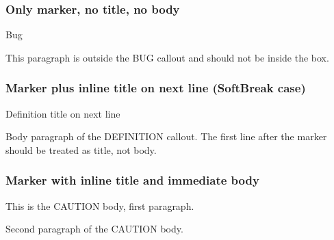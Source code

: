 \subsubsection{Only marker, no title, no
body}\label{only-marker-no-title-no-body}

\vspace{2mm}

\noindent\begin{tcolorbox}[colback=ocRed2Back,colframe=ocRed2Frame,coltitle=ocRed2Title,left=3mm,width=\linewidth,boxrule=0pt]

\hspace*{-2.5mm}\iconBug\; Bug

\end{tcolorbox}

This paragraph is outside the BUG callout and should not be inside the
box.

\subsubsection{Marker plus inline title on next line (SoftBreak
case)}\label{marker-plus-inline-title-on-next-line-softbreak-case}

\begin{tcolorbox}[breakable,colback=ocPinBack,colframe=ocPinFrame,coltitle=ocPinTitle,left=3mm,boxed title style={left=1mm},title={\hspace*{-2.5mm}\iconDefinition\; Definition}]

Definition title on next line

Body paragraph of the DEFINITION callout. The first line after the
marker should be treated as title, not body.

\end{tcolorbox}

\subsubsection{Marker with inline title and immediate
body}\label{marker-with-inline-title-and-immediate-body}

\begin{tcolorbox}[breakable,colback=ocOrgBack,colframe=ocOrgFrame,coltitle=ocOrgTitle,left=3mm,boxed title style={left=1mm},title={\hspace*{-2.5mm}\iconWarning\; Caution title}]

This is the CAUTION body, first paragraph.

Second paragraph of the CAUTION body.

\end{tcolorbox}


